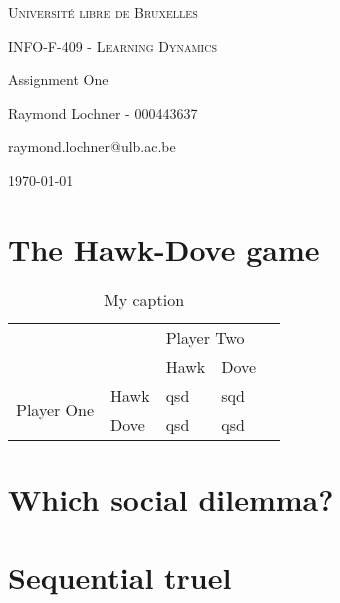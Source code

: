 \documentclass[a4paper, 11pt]{article}
\date{\today}
\begin{document}
\begin{titlepage}
	\centering
	{\scshape\LARGE Université libre de Bruxelles \par}
	\vspace{1cm}
	{\scshape\Large INFO-F-409 - Learning Dynamics\par}
	\vspace{1.5cm}
	{\huge\bfseries {Assignment One\par}}
	\vspace{2cm}
	{\Large Raymond Lochner - 000443637\par}
	\vspace{0.5cm}
	{\Large raymond.lochner@ulb.ac.be}
	\vfill
	
	\tableofcontents

\vfill
	{\large \today \par}
\end{titlepage}

\newpage

\section{The Hawk-Dove game}

\begin{table}[]
\centering
\caption{My caption}
\label{my-label}
\begin{tabular}{ll|l|l|l}
\cline{3-4}
                                                  &      & \multicolumn{2}{l|}{Player Two} &  \\ \cline{3-4}
                                                  &      & Hawk           & Dove           &  \\ \cline{1-4}
\multicolumn{1}{|l|}{\multirow{2}{*}{Player One}} & Hawk & qsd            & sqd            &  \\ \cline{2-4}
\multicolumn{1}{|l|}{}                            & Dove & qsd            & qsd            &  \\ \cline{1-4}
\end{tabular}
\end{table}

\section{Which social dilemma?}

\section{Sequential truel}
\end{document}
